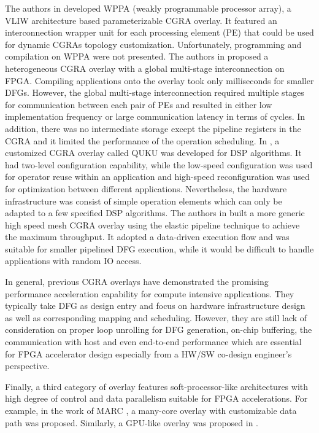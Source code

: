 The authors in \cite{kissler2006dynamically} developed WPPA (weakly programmable processor array), a VLIW architecture based parameterizable CGRA overlay. It featured an interconnection wrapper unit for each processing element (PE) that could be used for dynamic CGRAs topology customization. Unfortunately, programming and compilation on WPPA were not presented. The authors in \cite{ferreira2011fpga} proposed a heterogeneous CGRA overlay with a global multi-stage interconnection on FPGA. Compiling applications onto the overlay took only milliseconds for smaller DFGs. However, the global multi-stage interconnection required multiple stages for communication between each pair of PEs and resulted in either low implementation frequency or large communication latency in terms of cycles. In addition, there was no intermediate storage except the pipeline registers in the CGRA and it limited the performance of the operation scheduling.
In \cite{shukla2006quku}, a customized CGRA overlay called QUKU was developed for DSP algorithms. It had two-level configuration capability, while the low-speed configuration was used for operator reuse within an application and high-speed reconfiguration was used for optimization between different applications. Nevertheless, the hardware infrastructure was consist of simple operation elements which can only be adapted to a few specified DSP algorithms.
The authors in \cite{capalijia2013pipelined} built a more generic high speed mesh CGRA overlay using the elastic pipeline technique to achieve the maximum throughput. It adopted a data-driven execution flow and was suitable for smaller pipelined DFG execution, while it would be difficult to handle applications with random IO access. 

In general, previous CGRA overlays have demonstrated the promising performance acceleration capability for compute intensive applications. They typically take DFG as design entry and focus on hardware infrastructure design as well as corresponding mapping and scheduling. However, they are still lack of consideration on proper loop unrolling for DFG generation, on-chip buffering, the communication with host and even end-to-end performance which are essential for FPGA accelerator design especially from a HW/SW co-design engineer's perspective. 


Finally, a third category of overlay features soft-processor-like architectures with high degree of
control and data parallelism suitable for FPGA accelerations.  For example, in the work of MARC
\cite{Lebedev2010}, a many-core overlay with customizable data path was proposed.  Similarly, a
GPU-like overlay was proposed in \cite{Jeffrey2011potential}.


